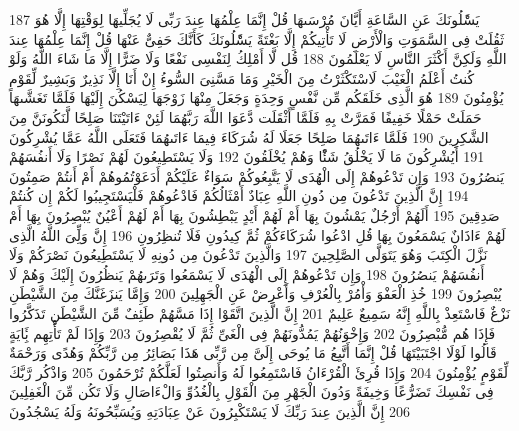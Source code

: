 \documentclass[20pt,a4paper]{article}
\begin{document}
{\tiny\colorbox{cl_aya}{187}} يَسَْٔلُونَكَ عَنِ السَّاعَةِ أَيَّانَ مُرْسَىهَا قُلْ إِنَّمَا عِلْمُهَا عِندَ رَبِّى لَا يُجَلِّيهَا لِوَقْتِهَا إِلَّا هُوَ ثَقُلَتْ فِى السَّمَوَتِ وَالْأَرْضِ لَا تَأْتِيكُمْ إِلَّا بَغْتَةً يَسَْٔلُونَكَ كَأَنَّكَ حَفِىٌّ عَنْهَا قُلْ إِنَّمَا عِلْمُهَا عِندَ اللَّهِ وَلَكِنَّ أَكْثَرَ النَّاسِ لَا يَعْلَمُونَ
{\tiny\colorbox{cl_aya}{188}} قُل لَّا أَمْلِكُ لِنَفْسِى نَفْعًا وَلَا ضَرًّا إِلَّا مَا شَاءَ اللَّهُ وَلَوْ كُنتُ أَعْلَمُ الْغَيْبَ لَاسْتَكْثَرْتُ مِنَ الْخَيْرِ وَمَا مَسَّنِىَ السُّوءُ إِنْ أَنَا إِلَّا نَذِيرٌ وَبَشِيرٌ لِّقَوْمٍ يُؤْمِنُونَ
{\tiny\colorbox{cl_aya}{189}} هُوَ الَّذِى خَلَقَكُم مِّن نَّفْسٍ وَحِدَةٍ وَجَعَلَ مِنْهَا زَوْجَهَا لِيَسْكُنَ إِلَيْهَا فَلَمَّا تَغَشَّىهَا حَمَلَتْ حَمْلًا خَفِيفًا فَمَرَّتْ بِهِ فَلَمَّا أَثْقَلَت دَّعَوَا اللَّهَ رَبَّهُمَا لَئِنْ ءَاتَيْتَنَا صَلِحًا لَّنَكُونَنَّ مِنَ الشَّكِرِينَ
{\tiny\colorbox{cl_aya}{190}} فَلَمَّا ءَاتَىهُمَا صَلِحًا جَعَلَا لَهُ شُرَكَاءَ فِيمَا ءَاتَىهُمَا فَتَعَلَى اللَّهُ عَمَّا يُشْرِكُونَ
{\tiny\colorbox{cl_aya}{191}} أَيُشْرِكُونَ مَا لَا يَخْلُقُ شَئًْا وَهُمْ يُخْلَقُونَ
{\tiny\colorbox{cl_aya}{192}} وَلَا يَسْتَطِيعُونَ لَهُمْ نَصْرًا وَلَا أَنفُسَهُمْ يَنصُرُونَ
{\tiny\colorbox{cl_aya}{193}} وَإِن تَدْعُوهُمْ إِلَى الْهُدَى لَا يَتَّبِعُوكُمْ سَوَاءٌ عَلَيْكُمْ أَدَعَوْتُمُوهُمْ أَمْ أَنتُمْ صَمِتُونَ
{\tiny\colorbox{cl_aya}{194}} إِنَّ الَّذِينَ تَدْعُونَ مِن دُونِ اللَّهِ عِبَادٌ أَمْثَالُكُمْ فَادْعُوهُمْ فَلْيَسْتَجِيبُوا لَكُمْ إِن كُنتُمْ صَدِقِينَ
{\tiny\colorbox{cl_aya}{195}} أَلَهُمْ أَرْجُلٌ يَمْشُونَ بِهَا أَمْ لَهُمْ أَيْدٍ يَبْطِشُونَ بِهَا أَمْ لَهُمْ أَعْيُنٌ يُبْصِرُونَ بِهَا أَمْ لَهُمْ ءَاذَانٌ يَسْمَعُونَ بِهَا قُلِ ادْعُوا شُرَكَاءَكُمْ ثُمَّ كِيدُونِ فَلَا تُنظِرُونِ
{\tiny\colorbox{cl_aya}{196}} إِنَّ وَلِِّىَ اللَّهُ الَّذِى نَزَّلَ الْكِتَبَ وَهُوَ يَتَوَلَّى الصَّلِحِينَ
{\tiny\colorbox{cl_aya}{197}} وَالَّذِينَ تَدْعُونَ مِن دُونِهِ لَا يَسْتَطِيعُونَ نَصْرَكُمْ وَلَا أَنفُسَهُمْ يَنصُرُونَ
{\tiny\colorbox{cl_aya}{198}} وَإِن تَدْعُوهُمْ إِلَى الْهُدَى لَا يَسْمَعُوا وَتَرَىهُمْ يَنظُرُونَ إِلَيْكَ وَهُمْ لَا يُبْصِرُونَ
{\tiny\colorbox{cl_aya}{199}} خُذِ الْعَفْوَ وَأْمُرْ بِالْعُرْفِ وَأَعْرِضْ عَنِ الْجَهِلِينَ
{\tiny\colorbox{cl_aya}{200}} وَإِمَّا يَنزَغَنَّكَ مِنَ الشَّيْطَنِ نَزْغٌ فَاسْتَعِذْ بِاللَّهِ إِنَّهُ سَمِيعٌ عَلِيمٌ
{\tiny\colorbox{cl_aya}{201}} إِنَّ الَّذِينَ اتَّقَوْا إِذَا مَسَّهُمْ طَئِفٌ مِّنَ الشَّيْطَنِ تَذَكَّرُوا فَإِذَا هُم مُّبْصِرُونَ
{\tiny\colorbox{cl_aya}{202}} وَإِخْوَنُهُمْ يَمُدُّونَهُمْ فِى الْغَىِّ ثُمَّ لَا يُقْصِرُونَ
{\tiny\colorbox{cl_aya}{203}} وَإِذَا لَمْ تَأْتِهِم بَِٔايَةٍ قَالُوا لَوْلَا اجْتَبَيْتَهَا قُلْ إِنَّمَا أَتَّبِعُ مَا يُوحَى إِلَىَّ مِن رَّبِّى هَذَا بَصَائِرُ مِن رَّبِّكُمْ وَهُدًى وَرَحْمَةٌ لِّقَوْمٍ يُؤْمِنُونَ
{\tiny\colorbox{cl_aya}{204}} وَإِذَا قُرِئَ الْقُرْءَانُ فَاسْتَمِعُوا لَهُ وَأَنصِتُوا لَعَلَّكُمْ تُرْحَمُونَ
{\tiny\colorbox{cl_aya}{205}} وَاذْكُر رَّبَّكَ فِى نَفْسِكَ تَضَرُّعًا وَخِيفَةً وَدُونَ الْجَهْرِ مِنَ الْقَوْلِ بِالْغُدُوِّ وَالْءَاصَالِ وَلَا تَكُن مِّنَ الْغَفِلِينَ
{\tiny\colorbox{cl_aya}{206}} إِنَّ الَّذِينَ عِندَ رَبِّكَ لَا يَسْتَكْبِرُونَ عَنْ عِبَادَتِهِ وَيُسَبِّحُونَهُ وَلَهُ يَسْجُدُونَ
\end{document}
